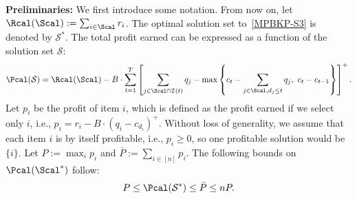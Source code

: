 \documentclass[11pt]{article}
\begin{document}

\noindent \textbf{Preliminaries:} We first introduce some notation. From now on, let $\Rcal(\Scal):=\sum_{i\in\Scal}r_i$. The optimal solution set to~\eqref{MPBKP-S3} is denoted by $\mathcal{S}^*$. The total profit earned can be expressed as a function of the solution set $\mathcal{S}$:
\begin{align}
\Pcal(\mathcal{S}) = \Rcal(\Scal) - B\cdot \sum_{t=1}^T\left[\sum_{j\in \Scal\cap\mathcal{I}(t)}q_j-\max\left\{c_t-\sum_{j\in \Scal , d_j \leq t }q_j,\ c_t-c_{t-1}\right\}\right]^+.
\end{align}
Let $p_i$ be the profit of item $i$, which is defined as the profit earned if we select only $i$, i.e., $p_i = r_i-B \cdot \left(q_i-c_{d_i}\right)^+$. Without loss of generality, we assume that each item $i$ is by itself profitable, i.e., $p_i\ge 0$, so one profitable solution would be $\{i\}$. %
Let $P:=\max_{i}p_i$ and $\bar{P}:=\sum_{i\in[n]}p_i$. %
The following bounds on $\Pcal(\Scal^*)$  follow: 
\begin{align}\label{upperP}
P \leq \Pcal(\mathcal{S}^*)\le \bar{P} \leq nP.
\end{align}
\end{document}
